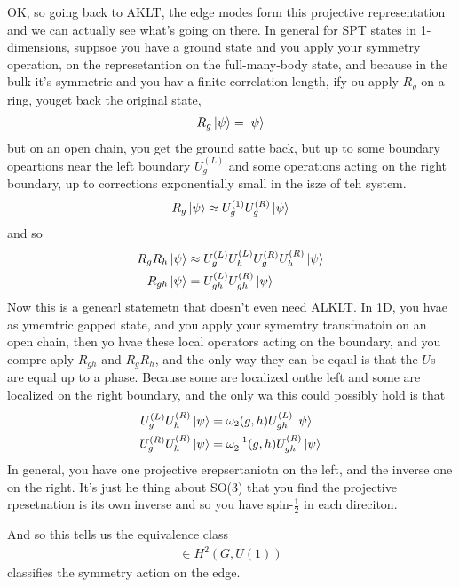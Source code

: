 OK, so going back to AKLT,
the edge modes form this projective representation and we can actually see
what's going on there.
In general for SPT states in 1-dimensions,
suppsoe you have a ground state and you apply your symmetry operation,
on the represetantion on the full-many-body state,
and because in the bulk it's symmetric and you hav a finite-correlation length,
ify ou apply $R_g$ on a ring,
youget back the original state,
\begin{align}
    R_g \ket{\psi} = \ket{\psi}
\end{align}
but on an open chain,
you get the ground satte back,
but up to some boundary opeartions near the left boundary $U_g^{(L)}$
and some operations acting on the right boundary,
up to corrections exponentially small in the isze of teh system.
\begin{align}
    R_g \ket{\psi} \approx
    U_g^{(1)} U_{g}^{(R)} \ket{\psi}
\end{align}
and so
\begin{align}
    R_g R_h \ket{\psi} &\approx
    U_g^{(L)} U_h^{(L)} 
    U_g^{(R)} U_h^{(R)} 
    \ket{\psi}\\
    R_{gh}\ket{\psi} &= U_{gh}^{(L)} U_{gh}^{(R)} \ket{\psi}
\end{align}
Now this is a genearl statemetn that doesn't even need ALKLT.
In 1D, you hvae as ymemtric gapped state,
and you apply your symemtry transfmatoin on an open chain,
then yo hvae these local operators acting on the boundary,
and you compre aply $R_{gh}$ and $R_g R_h$,
and the only way they can be eqaul is that the $U$s are equal up to a phase.
Because some are localized onthe left and some are localized on the right
boundary,
and the only wa this could possibly hold is that
\begin{align}
    U_g^{(L)} U_{h}^{(R)} \ket{\psi} &=
    \omega_2(g, h) U_{gh}^{(L)} \ket{\psi}\\
    U_g^{(R)} U_{h}^{(R)} \ket{\psi} &=
    \omega_2^{-1}(g, h) U_{gh}^{(R)} \ket{\psi}
\end{align}
In general,
you have one projective erepsertaniotn on the left,
and the inverse one on the right.
It's just he thing about SO(3) that you find the projective rpesetnation is its
own inverse and so you have spin-$\frac{1}{2}$ in each direciton.

And so this tells us the equivalence class
\begin{align}
    [\omega_2] \in H^2(G, U(1))
\end{align}
classifies the symmetry action on the edge.

